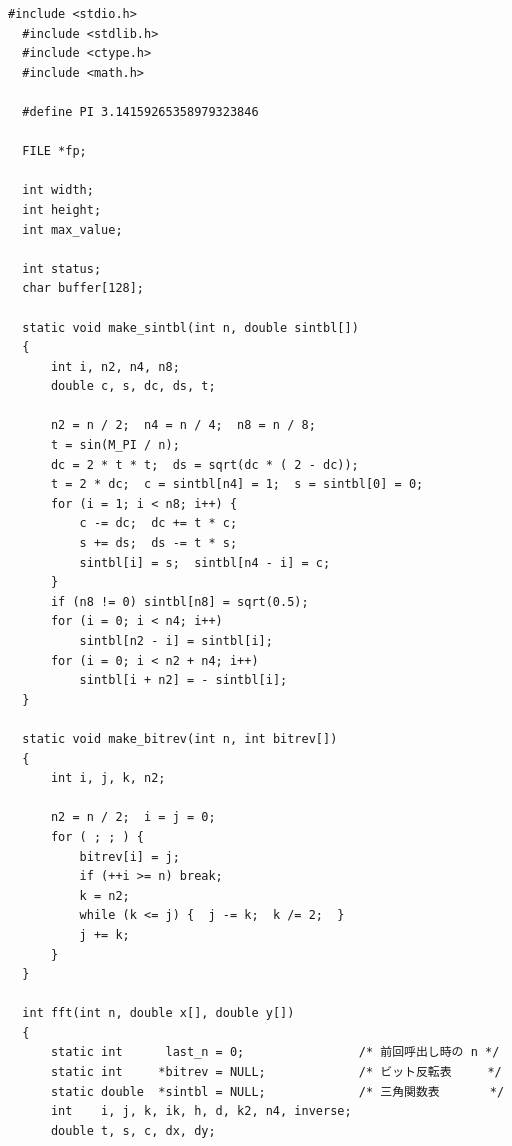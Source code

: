 \documentclass{jsarticle}
\begin{document}
\begin{lstlisting}[caption=filter.c,label=ほげ]
  #include <stdio.h>
  #include <stdlib.h>
  #include <ctype.h>
  #include <math.h>

  #define PI 3.14159265358979323846

  FILE *fp;

  int width;
  int height;
  int max_value;

  int status;
  char buffer[128];

  static void make_sintbl(int n, double sintbl[])
  {
      int i, n2, n4, n8;
      double c, s, dc, ds, t;

      n2 = n / 2;  n4 = n / 4;  n8 = n / 8;
      t = sin(M_PI / n);
      dc = 2 * t * t;  ds = sqrt(dc * ( 2 - dc));
      t = 2 * dc;  c = sintbl[n4] = 1;  s = sintbl[0] = 0;
      for (i = 1; i < n8; i++) {
          c -= dc;  dc += t * c;
          s += ds;  ds -= t * s;
          sintbl[i] = s;  sintbl[n4 - i] = c;
      }
      if (n8 != 0) sintbl[n8] = sqrt(0.5);
      for (i = 0; i < n4; i++)
          sintbl[n2 - i] = sintbl[i];
      for (i = 0; i < n2 + n4; i++)
          sintbl[i + n2] = - sintbl[i];
  }

  static void make_bitrev(int n, int bitrev[])
  {
      int i, j, k, n2;

      n2 = n / 2;  i = j = 0;
      for ( ; ; ) {
          bitrev[i] = j;
          if (++i >= n) break;
          k = n2;
          while (k <= j) {  j -= k;  k /= 2;  }
          j += k;
      }
  }

  int fft(int n, double x[], double y[])
  {
      static int      last_n = 0;                /* 前回呼出し時の n */
      static int     *bitrev = NULL;             /* ビット反転表     */
      static double  *sintbl = NULL;             /* 三角関数表       */
      int    i, j, k, ik, h, d, k2, n4, inverse;
      double t, s, c, dx, dy;


\end{lstlisting}
\end{document}
